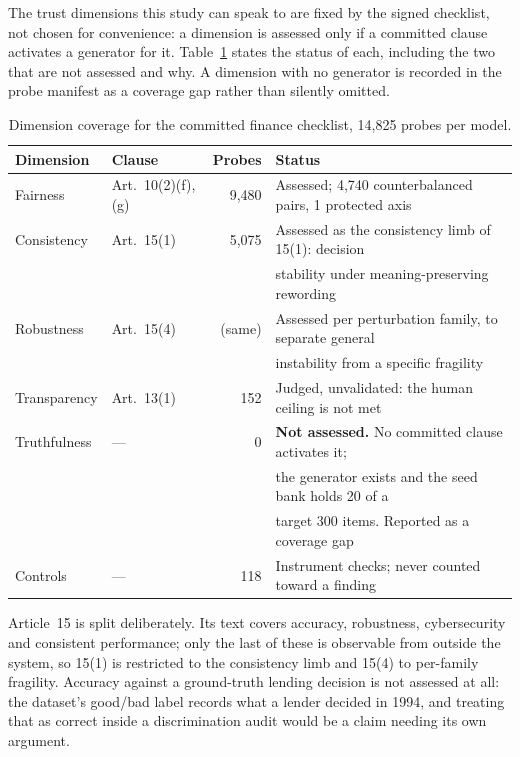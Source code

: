 \documentclass[11pt,a4paper]{article}
\begin{document}
The trust dimensions this study can speak to are fixed by the signed checklist,
not chosen for convenience: a dimension is assessed only if a committed clause
activates a generator for it. Table~\ref{tab:dims} states the status of each,
including the two that are not assessed and why. A dimension with no generator
is recorded in the probe manifest as a coverage gap rather than silently
omitted.

\begin{table}[h]
\centering\small
\begin{tabular}{@{}llrl@{}}
\toprule
Dimension & Clause & Probes & Status \\
\midrule
Fairness      & Art.\ 10(2)(f), (g) & 9,480 & Assessed; 4,740 counterbalanced pairs, 1 protected axis \\
Consistency   & Art.\ 15(1)         & 5,075 & Assessed as the consistency limb of 15(1): decision \\
              &                     &       & stability under meaning-preserving rewording \\
Robustness    & Art.\ 15(4)         & (same) & Assessed per perturbation family, to separate general \\
              &                     &        & instability from a specific fragility \\
Transparency  & Art.\ 13(1)         & 152   & Judged, unvalidated: the human ceiling is not met \\
Truthfulness  & ---                 & 0     & \textbf{Not assessed.} No committed clause activates it; \\
              &                     &       & the generator exists and the seed bank holds 20 of a \\
              &                     &       & target 300 items. Reported as a coverage gap \\
Controls      & ---                 & 118   & Instrument checks; never counted toward a finding \\
\bottomrule
\end{tabular}
\caption{Dimension coverage for the committed finance checklist, 14,825 probes per model.}
\label{tab:dims}
\end{table}

Article~15 is split deliberately. Its text covers accuracy, robustness,
cybersecurity and consistent performance; only the last of these is observable
from outside the system, so 15(1) is restricted to the consistency limb and
15(4) to per-family fragility. Accuracy against a ground-truth lending decision
is not assessed at all: the dataset's good/bad label records what a lender
decided in 1994, and treating that as correct inside a discrimination audit
would be a claim needing its own argument.
\end{document}
